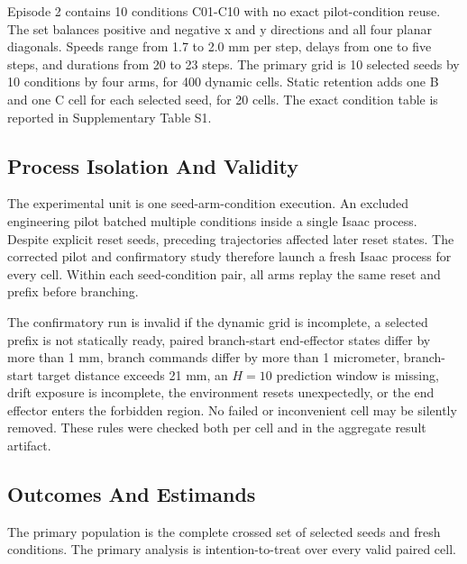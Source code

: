 \documentclass[10pt]{article}
\begin{document}
Episode 2 contains 10 conditions C01-C10 with no exact pilot-condition reuse. The set balances positive and negative x and y directions and all four planar diagonals. Speeds range from 1.7 to 2.0 mm per step, delays from one to five steps, and durations from 20 to 23 steps. The primary grid is 10 selected seeds by 10 conditions by four arms, for 400 dynamic cells. Static retention adds one B and one C cell for each selected seed, for 20 cells. The exact condition table is reported in Supplementary Table S1.

\subsection{Process Isolation And Validity}

The experimental unit is one seed-arm-condition execution. An excluded engineering pilot batched multiple conditions inside a single Isaac process. Despite explicit reset seeds, preceding trajectories affected later reset states. The corrected pilot and confirmatory study therefore launch a fresh Isaac process for every cell. Within each seed-condition pair, all arms replay the same reset and prefix before branching.

The confirmatory run is invalid if the dynamic grid is incomplete, a selected prefix is not statically ready, paired branch-start end-effector states differ by more than 1 mm, branch commands differ by more than 1 micrometer, branch-start target distance exceeds 21 mm, an \(H=10\) prediction window is missing, drift exposure is incomplete, the environment resets unexpectedly, or the end effector enters the forbidden region. No failed or inconvenient cell may be silently removed. These rules were checked both per cell and in the aggregate result artifact.

\subsection{Outcomes And Estimands}

The primary population is the complete crossed set of selected seeds and fresh conditions. The primary analysis is intention-to-treat over every valid paired cell.
\end{document}
